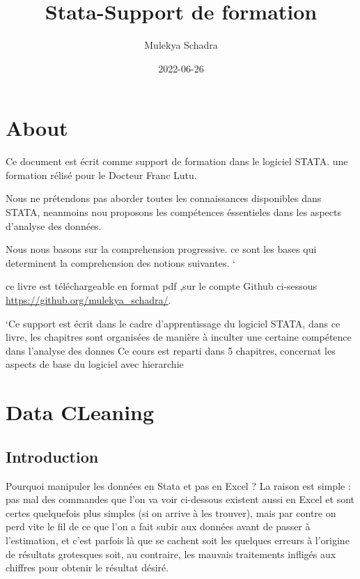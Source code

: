 \documentclass[
]{book}
\title{Stata-Support de formation}
\author{Mulekya Schadra}
\date{2022-06-26}
\begin{document}
\maketitle

{
\setcounter{tocdepth}{1}
\tableofcontents
}
\hypertarget{about}{%
\chapter*{About}\label{about}}

Ce document est écrit comme support de formation dans le logiciel STATA. une formation rélisé pour le Docteur Franc Lutu.

Nous ne prétendons pas aborder toutes les connaissances disponibles dans STATA,
neanmoins nou proposons les compétences éssentieles dans les aspects d'analyse des données.

Nous nous basons sur la comprehension progressive. ce sont les bases qui determinent la comprehension des notions suivantes. `

ce livre est téléchargeable en format pdf ,sur le compte Github ci-sessous \url{https://github.org/mulekya_schadra/}.

`Ce support est écrit dans le cadre d'apprentissage du logiciel STATA, dans ce livre, les chapitres sont organisées de manière à inculter une certaine compétence dans l'analyse des donnes
Ce cours est reparti dans 5 chapitres, concernat les aspects de base du logiciel avec hierarchie

\hypertarget{data-cleaning}{%
\chapter{Data CLeaning}\label{data-cleaning}}

\hypertarget{introduction}{%
\section{Introduction}\label{introduction}}

Pourquoi manipuler les données en Stata et pas en Excel ? La raison est simple : pas mal des commandes que l'on va voir ci-dessous existent aussi en Excel et sont certes quelquefois plus simples (si on arrive à les trouver), mais par contre on perd vite le fil de ce que l'on a fait subir aux données avant de passer à l'estimation, et c'est parfois là que se cachent soit les quelques erreurs à l'origine de résultats grotesques soit, au contraire, les mauvais traitements infligés aux chiffres pour obtenir le résultat désiré.
\end{document}
